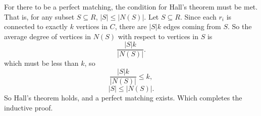 \documentclass[12pt]{article}
\begin{document}
For there to be a perfect matching, the condition for Hall's theorem must be met. That is, for any subset $S \subseteq R$, $|S| \leq |N(S)|$. Let $S\subseteq R$. Since each $r_i$ is connected to exactly $k$ vertices in $C$, there are $|S|k$ edges coming from $S$. So the average degree of vertices in $N(S)$ with respect to vertices in $S$ is
\[\frac{|S|k}{|N(S)|}.\]
which must be less than $k$, so
\[\frac{|S|k}{|N(S)|} \leq k,\]
\[|S| \leq |N(S)|.\]
So Hall's theorem holds, and a perfect matching exists. Which completes the inductive proof.
\end{document}
